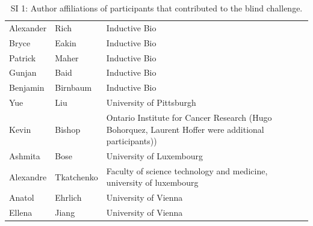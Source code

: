 \documentclass{article}
\begin{document}
\begin{table}[]
\begin{tabular}{lll}
\rowcolor[HTML]{FFFFFF} 
{\color[HTML]{434343} Alexander} & {\color[HTML]{434343} Rich} & {\color[HTML]{434343} Inductive Bio} \\
\rowcolor[HTML]{F8F9FA} 
{\color[HTML]{434343} Bryce} & {\color[HTML]{434343} Eakin} & {\color[HTML]{434343} Inductive Bio} \\
\rowcolor[HTML]{FFFFFF} 
{\color[HTML]{434343} Patrick} & {\color[HTML]{434343} Maher} & {\color[HTML]{434343} Inductive Bio} \\
\rowcolor[HTML]{F8F9FA} 
{\color[HTML]{434343} Gunjan} & {\color[HTML]{434343} Baid} & {\color[HTML]{434343} Inductive Bio} \\
\rowcolor[HTML]{FFFFFF} 
{\color[HTML]{434343} Benjamin} & {\color[HTML]{434343} Birnbaum} & {\color[HTML]{434343} Inductive Bio} \\
\rowcolor[HTML]{F8F9FA} 
{\color[HTML]{434343} Yue} & {\color[HTML]{434343} Liu} & {\color[HTML]{434343} University of Pittsburgh} \\
\rowcolor[HTML]{FFFFFF} 
{\color[HTML]{434343} Kevin} & {\color[HTML]{434343} Bishop} & {\color[HTML]{434343} Ontario Institute for Cancer Research (Hugo Bohorquez, Laurent Hoffer were additional participants))} \\
\rowcolor[HTML]{F8F9FA} 
{\color[HTML]{434343} Ashmita} & {\color[HTML]{434343} Bose} & {\color[HTML]{434343} University of Luxembourg} \\
\rowcolor[HTML]{FFFFFF} 
{\color[HTML]{434343} Alexandre} & {\color[HTML]{434343} Tkatchenko} & {\color[HTML]{434343} Faculty of science technology and medicine, university of luxembourg} \\
\rowcolor[HTML]{F8F9FA} 
{\color[HTML]{434343} Anatol} & {\color[HTML]{434343} Ehrlich} & {\color[HTML]{434343} University of Vienna} \\
\rowcolor[HTML]{FFFFFF} 
{\color[HTML]{434343} Ellena} & {\color[HTML]{434343} Jiang} & {\color[HTML]{434343} University of Vienna}
\end{tabular}
\caption{SI 1: Author affiliations of participants that contributed to the blind challenge.}
\end{table}
\end{document}

